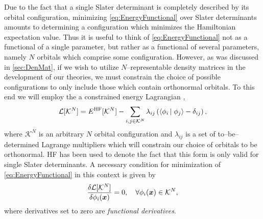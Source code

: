 Due to the fact that a single Slater determinant is completely described by its orbital configuration,
minimizing \cref{eq:EnergyFunctional} over Slater determinants amounts to determining a configuration
which minimizes the Hamiltonian expectation value. Thus it is useful to think of \cref{eq:EnergyFunctional}
not as a functional of a single parameter, but rather as a functional of several parameters, namely $N$
orbitals which comprise some configuration. However, as was discussed in \cref{sec:DenMat}, if we wish
to utilize $N$--representable density matrices in the development of our theories, we must constrain
the choice of possible configurations to only include those which contain orthonormal orbitals. To this
end we will employ the a constrained energy Lagrangian \cite{Ostlund12_book},
\begin{equation}
\mathcal{L}[\mathcal{K}^N] = E^\mathrm{HF}[\mathcal{K}^N] - \sum_{i,j \in \mathcal{K}^N} \lambda_{ij} \left( \left\langle \phi_i \left\vert\right. \phi_j \right\rangle - \delta_{ij} \right),
\end{equation}
where $\mathcal{K}^N$ is an arbitrary $N$ orbital configuration and $\lambda_{ij}$ is a set of to--be--determined Lagrange multipliers
which will constrain our choice of orbitals to be orthonormal. HF has been used to denote the fact that this form is only valid
for single Slater determinants.
A necessary condition for minimization of \cref{eq:EnergyFunctional} in this context is given by
\begin{equation}
\label{eq:ConstrMin}
\frac{\delta \mathcal{L}[\mathcal{K}^N]}{\delta \phi_i (\boldsymbol{x})} = 0 ,\quad \forall \phi_i(\boldsymbol{x}) \in \mathcal{K}^N,
\end{equation}
where derivatives set to zero are \emph{functional derivatives}. 

